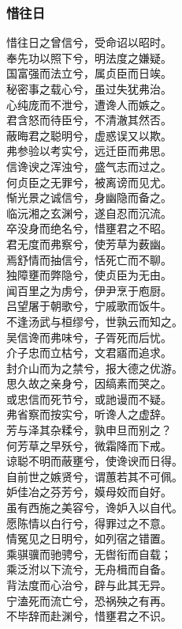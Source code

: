 \documentclass[]{article}
\begin{document}
\hypertarget{header-n110}{%
\subsubsection{惜往日}\label{header-n110}}

惜往日之曾信兮，受命诏以昭时。\\
奉先功以照下兮，明法度之嫌疑。\\
国富强而法立兮，属贞臣而日竢。\\
秘密事之载心兮，虽过失犹弗治。\\
心纯庞而不泄兮，遭谗人而嫉之。\\
君含怒而待臣兮，不清澈其然否。\\
蔽晦君之聪明兮，虚惑误又以欺。\\
弗参验以考实兮，远迁臣而弗思。\\
信谗谀之浑浊兮，盛气志而过之。\\
何贞臣之无罪兮，被离谤而见尤。\\
惭光景之诚信兮，身幽隐而备之。\\
临沅湘之玄渊兮，遂自忍而沉流。\\
卒没身而绝名兮，惜壅君之不昭。\\
君无度而弗察兮，使芳草为薮幽。\\
焉舒情而抽信兮，恬死亡而不聊。\\
独障壅而弊隐兮，使贞臣为无由。\\
闻百里之为虏兮，伊尹烹于庖厨。\\
吕望屠于朝歌兮，宁戚歌而饭牛。\\
不逢汤武与桓缪兮，世孰云而知之。\\
吴信谗而弗味兮，子胥死而后忧。\\
介子忠而立枯兮，文君寤而追求。\\
封介山而为之禁兮，报大德之优游。\\
思久故之亲身兮，因缟素而哭之。\\
或忠信而死节兮，或訑谩而不疑。\\
弗省察而按实兮，听谗人之虚辞。\\
芳与泽其杂糅兮，孰申旦而别之？\\
何芳草之早殀兮，微霜降而下戒。\\
谅聪不明而蔽壅兮，使谗谀而日得。\\
自前世之嫉贤兮，谓蕙若其不可佩。\\
妒佳冶之芬芳兮，嫫母姣而自好。\\
虽有西施之美容兮，谗妒入以自代。\\
愿陈情以白行兮，得罪过之不意。\\
情冤见之日明兮，如列宿之错置。\\
乘骐骥而驰骋兮，无辔衔而自载；\\
乘泛泭以下流兮，无舟楫而自备。\\
背法度而心治兮，辟与此其无异。\\
宁溘死而流亡兮，恐祸殃之有再。\\
不毕辞而赴渊兮，惜壅君之不识。
\end{document}
